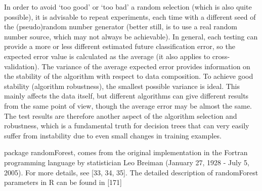 \documentclass[11pt,openany,executivepaper]{book}
\begin{document}
In order to avoid ‘too good’ or ‘too bad’ a random selection (which is also quite
possible), it is advisable to repeat experiments, each time with a different seed
of the (pseudo)random number generator (better still, is to use a real random
number source, which may not always be achievable).
In general, each testing can provide a more or less different estimated future
classification error, so the expected error value is calculated as the average (it also
applies to cross-validation). The variance of the average expected error provides
information on the stability of the algorithm with respect to data composition.
To achieve good stability (algorithm robustness), the smallest possible variance
is ideal.
This mainly affects the data itself, but different algorithms can give different
results from the same point of view, though the average error may be almost the
same. The test results are therefore another aspect of the algorithm selection and
robustness, which is a fundamental truth for decision trees that can very easily
suffer from instability due to even small changes in training examples.

package randomForest, comes from the original implementation in the Fortran
programming language by statistician Leo Breiman (January 27, 1928 - July 5,
2005). For more details, see [33, 34, 35]. The detailed description of randomForest parameters in R can be found in [171]
\end{document}
